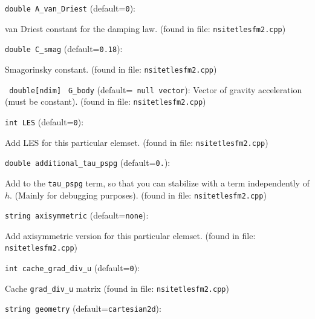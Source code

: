 \item\verb+double A_van_Driest+ {\rm(default=\verb|0|)}:

van Driest constant for the damping law.
 (found in file: \verb+nsitetlesfm2.cpp+)
\item\verb+double C_smag+ {\rm(default=\verb|0.18|)}:

Smagorinsky constant.
 (found in file: \verb+nsitetlesfm2.cpp+)
\item\verb+ double[ndim]+ \verb+ G_body+ {\rm(default=\verb| null vector|)}:
 Vector of gravity acceleration (must be constant).  (found in file: \verb+nsitetlesfm2.cpp+)
\item\verb+int LES+ {\rm(default=\verb|0|)}:

Add LES for this particular elemset.
 (found in file: \verb+nsitetlesfm2.cpp+)
\item\verb+double additional_tau_pspg+ {\rm(default=\verb|0.|)}:

Add to the \verb+tau_pspg+ term, so that you can stabilize with a term
 independently of $h$. (Mainly for debugging purposes). 
 (found in file: \verb+nsitetlesfm2.cpp+)
\item\verb+string axisymmetric+ {\rm(default=\verb|none|)}:

Add axisymmetric version for this particular elemset.
 (found in file: \verb+nsitetlesfm2.cpp+)
\item\verb+int cache_grad_div_u+ {\rm(default=\verb|0|)}:

Cache \verb+grad_div_u+ matrix
 (found in file: \verb+nsitetlesfm2.cpp+)
\item\verb+string geometry+ {\rm(default=\verb|cartesian2d|)}:

